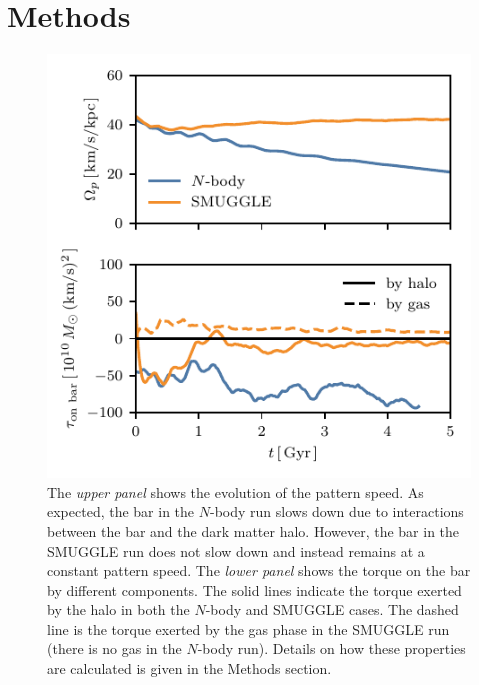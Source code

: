\documentclass[fleqn,usenatbib]{mnras}
\newcommand{\Nbody}{$N$-body}
\begin{document}

\section{Methods}
\label{sec:methods}
\begin{figure}
    \centering
    \includegraphics[width=\columnwidth]{fig/ps_torque.pdf}
    \caption{The \textit{upper panel} shows the evolution of the pattern speed.
    As expected, the bar in the \Nbody{} run slows down due to interactions
    between the bar and the dark matter halo. However, the bar in the SMUGGLE
    run does not slow down and instead remains at a constant pattern speed. The
    \textit{lower panel} shows the torque on the bar by different components.
    The solid lines indicate the torque exerted by the halo in both the \Nbody{}
    and SMUGGLE cases. The dashed line is the torque exerted by the gas phase in
    the SMUGGLE run (there is no gas in the \Nbody{} run). Details on how these
    properties are calculated is given in the Methods section.}\label{fig:prop}
\end{figure}
\end{document}
